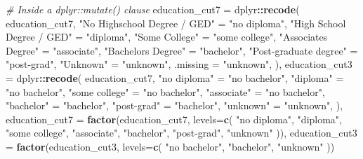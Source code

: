 \documentclass[
]{book}
\newenvironment{Shaded}{\begin{snugshade}}{\end{snugshade}}
\newcommand{\CommentTok}[1]{\textcolor[rgb]{0.56,0.35,0.01}{\textit{#1}}}
\newcommand{\DataTypeTok}[1]{\textcolor[rgb]{0.13,0.29,0.53}{#1}}
\newcommand{\KeywordTok}[1]{\textcolor[rgb]{0.13,0.29,0.53}{\textbf{#1}}}
\newcommand{\NormalTok}[1]{#1}
\newcommand{\OperatorTok}[1]{\textcolor[rgb]{0.81,0.36,0.00}{\textbf{#1}}}
\newcommand{\StringTok}[1]{\textcolor[rgb]{0.31,0.60,0.02}{#1}}
\begin{document}
\begin{Shaded}
\begin{Highlighting}[]
\CommentTok{\# Inside a dplyr::mutate() clause}
\NormalTok{education\_cut7      =}\StringTok{ }\NormalTok{dplyr}\OperatorTok{::}\KeywordTok{recode}\NormalTok{(}
\NormalTok{  education\_cut7,}
  \StringTok{"No Highschool Degree / GED"}\NormalTok{  =}\StringTok{ "no diploma"}\NormalTok{,}
  \StringTok{"High School Degree / GED"}\NormalTok{    =}\StringTok{ "diploma"}\NormalTok{,}
  \StringTok{"Some College"}\NormalTok{                =}\StringTok{ "some college"}\NormalTok{,}
  \StringTok{"Associate\textquotesingle{}s Degree"}\NormalTok{          =}\StringTok{ "associate"}\NormalTok{,}
  \StringTok{"Bachelor\textquotesingle{}s Degree"}\NormalTok{           =}\StringTok{ "bachelor"}\NormalTok{,}
  \StringTok{"Post{-}graduate degree"}\NormalTok{        =}\StringTok{ "post{-}grad"}\NormalTok{,}
  \StringTok{"Unknown"}\NormalTok{                     =}\StringTok{ "unknown"}\NormalTok{,}
  \DataTypeTok{.missing                      =} \StringTok{"unknown"}\NormalTok{,}
\NormalTok{),}
\NormalTok{education\_cut3      =}\StringTok{ }\NormalTok{dplyr}\OperatorTok{::}\KeywordTok{recode}\NormalTok{(}
\NormalTok{  education\_cut7,}
  \StringTok{"no diploma"}\NormalTok{    =}\StringTok{ "no bachelor"}\NormalTok{,}
  \StringTok{"diploma"}\NormalTok{       =}\StringTok{ "no bachelor"}\NormalTok{,}
  \StringTok{"some college"}\NormalTok{  =}\StringTok{ "no bachelor"}\NormalTok{,}
  \StringTok{"associate"}\NormalTok{     =}\StringTok{ "no bachelor"}\NormalTok{,}
  \StringTok{"bachelor"}\NormalTok{      =}\StringTok{ "bachelor"}\NormalTok{,}
  \StringTok{"post{-}grad"}\NormalTok{     =}\StringTok{ "bachelor"}\NormalTok{,}
  \StringTok{"unknown"}\NormalTok{       =}\StringTok{ "unknown"}\NormalTok{,}
\NormalTok{),}
\NormalTok{education\_cut7 =}\StringTok{ }\KeywordTok{factor}\NormalTok{(education\_cut7, }\DataTypeTok{levels=}\KeywordTok{c}\NormalTok{(}
  \StringTok{"no diploma"}\NormalTok{,}
  \StringTok{"diploma"}\NormalTok{,}
  \StringTok{"some college"}\NormalTok{,}
  \StringTok{"associate"}\NormalTok{,}
  \StringTok{"bachelor"}\NormalTok{,}
  \StringTok{"post{-}grad"}\NormalTok{,}
  \StringTok{"unknown"}
\NormalTok{)),}
\NormalTok{education\_cut3 =}\StringTok{ }\KeywordTok{factor}\NormalTok{(education\_cut3, }\DataTypeTok{levels=}\KeywordTok{c}\NormalTok{(}
  \StringTok{"no bachelor"}\NormalTok{,}
  \StringTok{"bachelor"}\NormalTok{,}
  \StringTok{"unknown"}
\NormalTok{))}
\end{Highlighting}
\end{Shaded}
\end{document}
